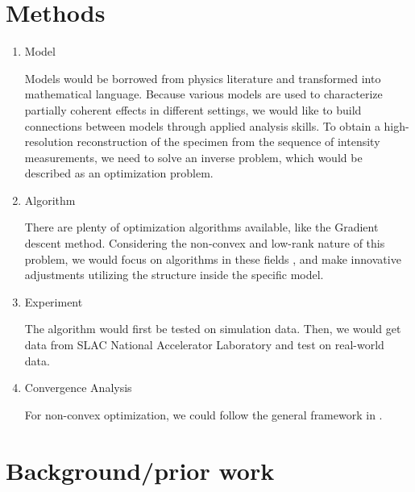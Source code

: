 \documentclass{article}
\numberwithin{equation}{section}
\begin{document}
\section{Methods}
\begin{enumerate}
\item Model

Models would be borrowed from physics literature and transformed into mathematical language. Because various models are used to characterize partially coherent effects in different settings, we would like to build connections between models through applied analysis skills. To obtain a high-resolution reconstruction of the specimen from the sequence of intensity measurements, we need to solve an inverse problem, which would be described as an optimization problem. 

\item Algorithm 

There are plenty of optimization algorithms available, like the Gradient descent method.
Considering the non-convex and low-rank nature of this problem, we would focus on algorithms in these fields \cite{lowrank}\cite{ADMM}, and make innovative adjustments utilizing the structure inside the specific model.

\item Experiment

The algorithm would first be tested on simulation data. Then, we would get data from SLAC National Accelerator Laboratory and test on real-world data.

\item Convergence Analysis

For non-convex optimization, we could follow the general framework in \cite{nonconvex}.



\end{enumerate}

\section{Background/prior work}
\end{document}
